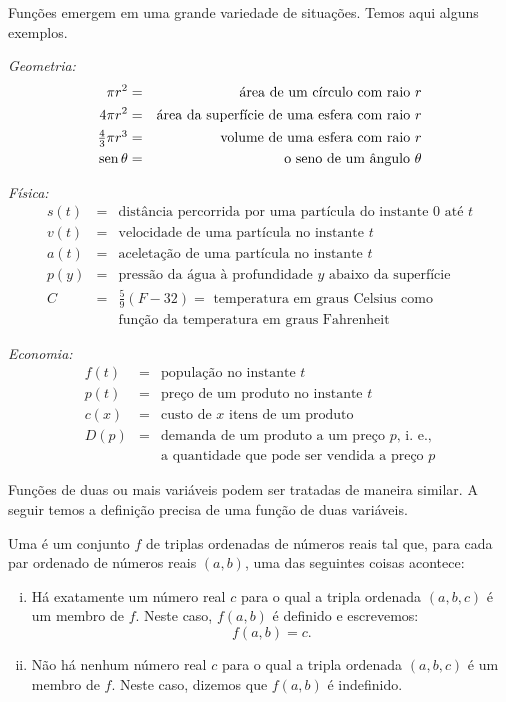 Funções emergem em uma grande variedade de situações. Temos aqui
alguns exemplos.

\emph{Geometria:}
\begin{eqnarray*}
     \pi r^2 & = & \text{área de um círculo com raio } r \\
   4 \pi r^2 & = & \text{área da superfície de uma esfera com raio } r \\
\textstyle
   \frac{4}{3}\pi r^3 & = & \text{volume de uma esfera com raio } r \\
   \operatorname{sen} \theta & = & \text{o seno de um ângulo } \theta
\end{eqnarray*}

\emph{Física:}
\begin{eqnarray*}
  s(t) & = & \text{distância percorrida por uma partícula do instante } 0 \text{ até } t \\
  v(t) & = & \text{velocidade de uma partícula no instante } t \\
  a(t) & = & \text{aceletação de uma partícula no instante } t \\
  p(y) & = & \text{pressão da água à profundidade } y \text{ abaixo da superfície} \\
     C & = &\textstyle \frac{5}{9}(F - 32) = \text{ temperatura em graus Celsius como}\\
       &   & \text{função da temperatura em graus Fahrenheit}
\end{eqnarray*}

\emph{Economia:}
\begin{eqnarray*}
  f(t) & = & \text{população no instante } t \\
  p(t) & = & \text{preço de um produto no instante } t \\
  c(x) & = & \text{custo de } x \text{ itens de um produto} \\
  D(p) & = & \text{demanda de um produto a um preço } p \text{, i. e.,} \\
       &   & \text{a quantidade que pode ser vendida a preço } p
\end{eqnarray*}

Funções de duas ou mais variáveis podem ser tratadas de maneira
similar. A seguir temos a definição precisa de uma função de
duas variáveis.

\begin{defin}
Uma  é um conjunto $f$ de
triplas ordenadas de números reais tal que, para cada par ordenado
de números reais $(a, b)$, uma das seguintes coisas acontece:
\begin{enumerate}[(i)]
\item Há exatamente um número real $c$ para o qual a tripla
      ordenada $(a, b, c)$ é um membro de $f$. Neste caso, $f(a, b)$
      é definido e escrevemos:
\[
  f(a, b) = c.
\]
\item Não há nenhum número real $c$ para o qual a tripla
      ordenada $(a, b, c)$ é um membro de $f$. Neste caso,
      dizemos que $f(a, b)$ é indefinido.
\end{enumerate}
\end{defin}


